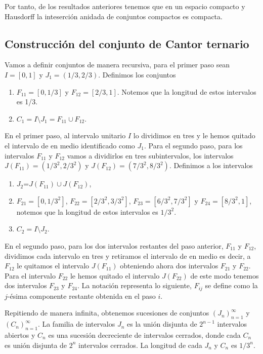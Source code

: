  Por tanto, de los resultados anteriores tenemos que en un espacio compacto y Hausdorff la inteserción anidada de conjuntos compactos es compacta. 
 
\subsection*{Construcción del conjunto de Cantor ternario}
Vamos a definir conjuntos de manera recursiva, para el primer paso  sean $I=[0,1]$ y $J_1=(1/3,2/3)$. Definimos los conjuntos

\begin{enumerate}
\item $F_{11} = [0,1/3]$ y $F_{12} = [2/3,1]$. Notemos que la longitud de estos intervalos es 1/3.
\item $C_1 = I \setminus J_1= F_{11} \cup F_{12}$. 
\end{enumerate} 

En el primer paso, al intervalo unitario $I$ lo dividimos en tres y  le hemos quitado el intervalo de en medio identificado como $J_1$.
Para el segundo paso, para los intervalos $F_{11}$ y $F_{12}$ vamos a dividirlos en tres subintervalos, los intervalos $J(F_{11})=(1/3^2,2/3^2)$ y $J(F_{12})=(7/3^2,8/3^2)$. Definimos a los intervalos

\begin{enumerate}
\item $J_2$=$J(F_{11}) \cup J(F_{12})$,
\item $F_{21}=[0,1/3^2]$,  $F_{22}=[2/3^2,3/3^2]$, $F_{23}=[6/3^2,7/3^2]$ y $F_{24}=[8/3^2,1]$, notemos que la longitud de estos intervalos es $1/3^2$.
\item $C_2=I \setminus J_2$. 
\end{enumerate}

En el segundo paso, para los dos intervalos restantes del paso anterior, $F_{11}$ y $F_{12}$, dividimos cada intervalo en tres y retiramos el intervalo de en medio es decir, a $F_{12}$ le quitamos el intervalo $J(F_{11})$ obteniendo ahora dos intervalos $F_{21}$ y $F_{22}$. Para el intervalo $F_{22}$ le hemos quitado el intervalo $J(F_{22})$ de este modo tenemos dos intervalos $F_{23}$ y $F_{24}$. La notación representa lo siguiente, $F_{ij}$ se define como la $j$-ésima componente restante obtenida en el paso $i$. 

Repitiendo de manera infinita, obtenemos sucesiones de conjuntos $(J_n)_{n=1}^\infty$ y $(C_n)_{n=1}^\infty$. La familia de intervalos $J_n$ es la unión disjunta de $2^{n-1}$ intervalos abiertos y $C_n$ es una sucesión decreciente de intervalos cerrados, donde cada $C_n$ es unión disjunta de $2^n$ intervalos cerrados. La longitud de cada $J_n$ y $C_n$ es $1/3^n.$

